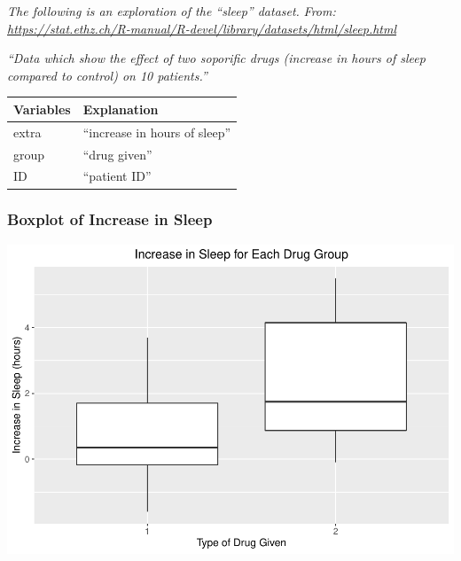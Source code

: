 \documentclass[]{article}
\newenvironment{Shaded}{\begin{snugshade}}{\end{snugshade}}
\newcommand{\DataTypeTok}[1]{\textcolor[rgb]{0.13,0.29,0.53}{#1}}
\newcommand{\FloatTok}[1]{\textcolor[rgb]{0.00,0.00,0.81}{#1}}
\newcommand{\KeywordTok}[1]{\textcolor[rgb]{0.13,0.29,0.53}{\textbf{#1}}}
\newcommand{\NormalTok}[1]{#1}
\newcommand{\OperatorTok}[1]{\textcolor[rgb]{0.81,0.36,0.00}{\textbf{#1}}}
\newcommand{\StringTok}[1]{\textcolor[rgb]{0.31,0.60,0.02}{#1}}
\begin{document}
\emph{The following is an exploration of the ``sleep'' dataset.}
\emph{From:
\url{https://stat.ethz.ch/R-manual/R-devel/library/datasets/html/sleep.html}}

\emph{``Data which show the effect of two soporific drugs (increase in
hours of sleep compared to control) on 10 patients.''}

\begin{longtable}[]{@{}ll@{}}
\toprule
Variables & Explanation\tabularnewline
\midrule
\endhead
extra & ``increase in hours of sleep''\tabularnewline
group & ``drug given''\tabularnewline
ID & ``patient ID''\tabularnewline
\bottomrule
\end{longtable}

\hypertarget{boxplot-of-increase-in-sleep}{%
\subsubsection{Boxplot of Increase in
Sleep}\label{boxplot-of-increase-in-sleep}}

\begin{Shaded}
\end{Shaded}

\includegraphics{hw02_files/figure-latex/load sleep and boxplot of sleep-1.pdf}
\end{document}
